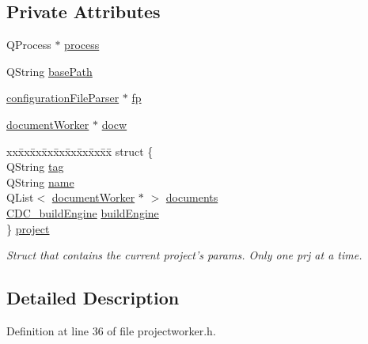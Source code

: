 \subsection*{Private Attributes}
\begin{DoxyCompactItemize}
\item 
Q\+Process $\ast$ \hyperlink{classproject_worker_a862f3fc1a316f1542e843281e2667344}{process}
\item 
Q\+String \hyperlink{classproject_worker_acebb1a43f3056c7bb74bfe8d6bd0411e}{base\+Path}
\item 
\hyperlink{classconfiguration_file_parser}{configuration\+File\+Parser} $\ast$ \hyperlink{classproject_worker_a3e67d186faa22b7cfa338ae9e0272da0}{fp}
\item 
\hyperlink{classdocument_worker}{document\+Worker} $\ast$ \hyperlink{classproject_worker_a5bd23894e1f09311b4bebcd92c644e8b}{docw}
\item 
\begin{tabbing}
xx\=xx\=xx\=xx\=xx\=xx\=xx\=xx\=xx\=\kill
struct \{\\
\>QString \hyperlink{classproject_worker_aba02c11fc0a014e1743feff1d8347ad2}{tag}\\
\>QString \hyperlink{classproject_worker_a133798ef8a45a15919e4f65e2bb3df71}{name}\\
\>QList$<$ \hyperlink{classdocument_worker}{documentWorker} $\ast$ $>$ \hyperlink{classproject_worker_acdd055f2642057c2766e0aeded1237c5}{documents}\\
\>\hyperlink{cdcdefs_8h_abd38cc943467f0d66216a60454d5ee06}{CDC\_buildEngine} \hyperlink{classproject_worker_a88c5f6033c06ee66f102642cfe32497c}{buildEngine}\\
\} \hyperlink{classproject_worker_a1e4589fdd07b5d6063e703b211dd8aa9}{project}\\

\end{tabbing}\begin{DoxyCompactList}\small\item\em Struct that contains the current project's params. Only one prj at a time. \end{DoxyCompactList}\end{DoxyCompactItemize}


\subsection{Detailed Description}


Definition at line 36 of file projectworker.\+h.



